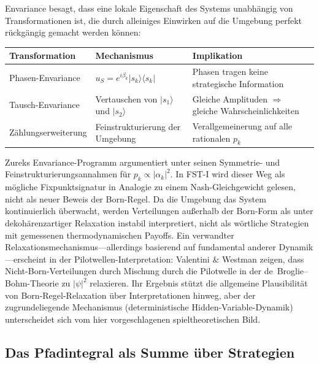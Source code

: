 \documentclass[12pt,a4paper]{article}
\theoremstyle{remark}
\begin{document}
Envariance besagt, dass eine lokale Eigenschaft des Systems unabh\"angig von Transformationen ist, die durch alleiniges Einwirken auf die Umgebung perfekt r\"uckg\"angig gemacht werden k\"onnen:

\begin{center}
\begin{tabularx}{\textwidth}{@{}>{\raggedright\arraybackslash}p{3.9cm}>{\raggedright\arraybackslash}p{3.8cm}Y@{}}
\toprule
\textbf{Transformation} & \textbf{Mechanismus} & \textbf{Implikation} \\
\midrule
Phasen-Envariance & $u_S = e^{i\beta_k}|s_k\rangle\langle s_k|$ & Phasen tragen keine strategische Information \\
Tausch-Envariance & Vertauschen von $|s_1\rangle$ und $|s_2\rangle$ & Gleiche Amplituden $\Rightarrow$ gleiche Wahrscheinlichkeiten \\
Z\"ahlungserweiterung & Feinstrukturierung der Umgebung & Verallgemeinerung auf alle rationalen $p_k$ \\
\bottomrule
\end{tabularx}
\end{center}

Zureks Envariance-Programm argumentiert unter seinen Symmetrie- und Feinstrukturierungsannahmen f\"ur $p_k \propto |\alpha_k|^2$. In FST-I wird dieser Weg als m\"ogliche Fixpunktsignatur in Analogie zu einem Nash-Gleichgewicht gelesen, nicht als neuer Beweis der Born-Regel. Da die Umgebung das System kontinuierlich \"uberwacht, werden Verteilungen au\ss{}erhalb der Born-Form als unter dekoh\"arenzartiger Relaxation instabil interpretiert, nicht als w\"ortliche Strategien mit gemessenen thermodynamischen Payoffs. Ein verwandter Relaxationsmechanismus---allerdings basierend auf fundamental anderer Dynamik---erscheint in der Pilotwellen-Interpretation: Valentini \& Westman \citep{ValentiniWestman2005} zeigen, dass Nicht-Born-Verteilungen durch Mischung durch die Pilotwelle in der de~Broglie--Bohm-Theorie zu $|\psi|^2$ relaxieren. Ihr Ergebnis st\"utzt die allgemeine Plausibilit\"at von Born-Regel-Relaxation \"uber Interpretationen hinweg, aber der zugrundeliegende Mechanismus (deterministische Hidden-Variable-Dynamik) unterscheidet sich vom hier vorgeschlagenen spieltheoretischen Bild.

\subsection{Das Pfadintegral als Summe \"uber Strategien}
\end{document}
